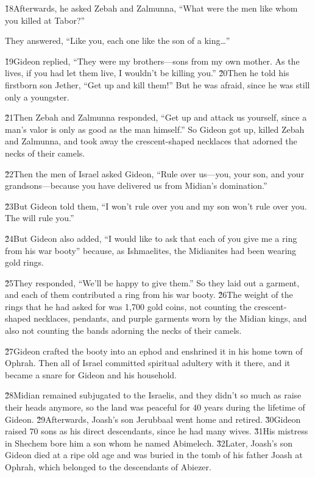 \v{18}Afterwards, he asked Zebah and Zalmunna, ``What were the men like whom you killed at Tabor?''

They answered, ``Like you, each one like the son of a king{\ldots}''

\v{19}Gideon replied, ``They were my brothers---sons from my own mother. As the  lives, if you had let them live, I wouldn't be killing you.'' \v{20}Then he told his firstborn son Jether, ``Get up and kill them!'' But he was afraid, since he was still only a youngster.

\v{21}Then Zebah and Zalmunna responded, ``Get up and attack us yourself, since a man's valor is only as good as the man himself.'' So Gideon got up, killed Zebah and Zalmunna, and took away the crescent-shaped necklaces that adorned the necks of their camels.

\v{22}Then the men of Israel asked Gideon, ``Rule over us---you, your son, and your grandsons---because you have delivered us from Midian's domination.''

\v{23}But Gideon told them, ``I won't rule over you and my son won't rule over you. The  will rule you.''

\v{24}But Gideon also added, ``I would like to ask that each of you give me a ring from his war booty'' because, as Ishmaelites, the Midianites had been wearing gold rings.

\v{25}They responded, ``We'll be happy to give them.'' So they laid out a garment, and each of them contributed a ring from his war booty. \v{26}The weight of the rings that he had asked for was 1,700 gold coins, not counting the crescent-shaped necklaces, pendants, and purple garments worn by the Midian kings, and also not counting the bands adorning the necks of their camels.

\v{27}Gideon crafted the booty into an ephod and enshrined it in his home town of Ophrah. Then all of Israel committed spiritual adultery with it there, and it became a snare for Gideon and his household.

\v{28}Midian remained subjugated to the Israelis, and they didn't so much as raise their heads anymore, so the land was peaceful for 40 years during the lifetime of Gideon. \v{29}Afterwards, Joash's son Jerubbaal went home and retired. \v{30}Gideon raised 70 sons as his direct descendants, since he had many wives. \v{31}His mistress in Shechem bore him a son whom he named Abimelech. \v{32}Later, Joash's son Gideon died at a ripe old age and was buried in the tomb of his father Joash at Ophrah, which belonged to the descendants of Abiezer.

